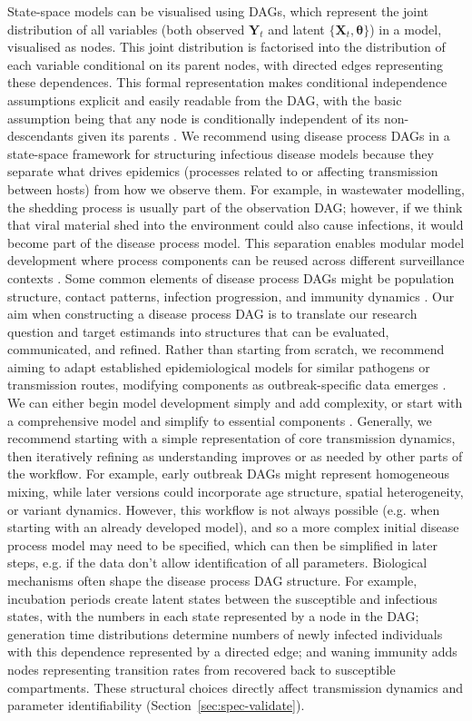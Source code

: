 \documentclass{article}
\begin{document}
State-space models can be visualised using \ac{DAG}s, which represent the joint distribution of all variables (both observed $\boldsymbol{Y}_t$ and latent $\{\boldsymbol{X}_t, \boldsymbol{\theta}\}$) in a model, visualised as nodes. This joint distribution is factorised into the distribution of each variable conditional on its parent nodes, with directed edges representing these dependences. This formal representation makes conditional independence assumptions explicit and easily readable from the \ac{DAG}, with the basic assumption being that any node is conditionally independent of its non-descendants given its parents \citep{lauritzen1996graphical}. We recommend using disease process \ac{DAG}s in a state-space framework for structuring infectious disease models because they separate what drives epidemics (processes related to or affecting transmission between hosts) from how we observe them. 
For example, in wastewater modelling, the shedding process is usually part of the observation \ac{DAG}; however, if we think that viral material shed into the environment could also cause infections, it would become part of the disease process model.
This separation enables modular model development where process components can be reused across different surveillance contexts \citep{nicholson2022interoperability}.
Some common elements of disease process \ac{DAG}s might be population structure, contact patterns, infection progression, and immunity dynamics \citep{deangelis2018analysing}. 
Our aim when constructing a disease process \ac{DAG} is to translate our research question and target estimands into structures that can be evaluated, communicated, and refined.
Rather than starting from scratch, we recommend aiming to adapt established epidemiological models for similar pathogens or transmission routes, modifying components as outbreak-specific data emerges \citep{gelman2020bayesian}.
We can either begin model development simply and add complexity, or start with a comprehensive model and simplify to essential components \citep{gelman2020bayesian}.
Generally, we recommend starting with a simple representation of core transmission dynamics, then iteratively refining as understanding improves or as needed by other parts of the workflow.
For example, early outbreak \ac{DAG}s might represent homogeneous mixing, while later versions could incorporate age structure, spatial heterogeneity, or variant dynamics.
However, this workflow is not always possible (e.g. when starting with an already developed model), and so a more complex initial disease process model may need to be specified, which can then be simplified in later steps, e.g. if the data don't allow identification of all parameters.
Biological mechanisms often shape the disease process \ac{DAG} structure. For example, incubation periods create latent states between the susceptible and infectious states, with the numbers in each state represented by a node in the \ac{DAG}; generation time distributions determine numbers of newly infected individuals with this dependence represented by a directed edge; and waning immunity adds nodes representing transition rates from recovered back to susceptible compartments.
These structural choices directly affect transmission dynamics and parameter identifiability (Section~\ref{sec:spec-validate}).
\end{document}
